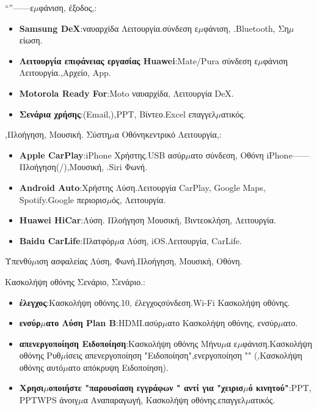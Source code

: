 “”——ε$\mu$φάνιση, έξοδος,:

\begin{itemize}
  \item \textbf{Samsung DeX}:ναυαρχίδα Λειτουργία.σύνδεση ε$\mu$φάνιση, .Bluetooth, Ση$\mu$είωση.
  \item \textbf{Λειτουργία επιφάνειας εργασίας Huawei}:Mate/Pura σύνδεση ε$\mu$φάνιση Λειτουργία.,Αρχείο, App.
  \item \textbf{Motorola Ready For}:Moto ναυαρχίδα, Λειτουργία DeX.
  \item \textbf{Σενάρια χρήσης}:(Email,),PPT, Βίντεο.Excel επαγγελ$\mu$ατικός.
\end{itemize}


,Πλοήγηση, Μουσική. Σύστη$\mu$α Οθόνηκεντρικό Λειτουργία,:

\begin{itemize}
  \item \textbf{Apple CarPlay}:iPhone Χρήστης.USB ασύρ$\mu$ατο σύνδεση, Οθόνη iPhone——Πλοήγηση(/),Μουσική, .Siri Φωνή.
  \item \textbf{Android Auto}:Χρήστης Λύση.Λειτουργία CarPlay, Google Maps, Spotify.Google περιορισ$\mu$ός, Λειτουργία.
  \item \textbf{Huawei HiCar}:Λύση. Πλοήγηση Μουσική, Βιντεοκλήση, Λειτουργία.
  \item \textbf{Baidu CarLife}:Πλατφόρ$\mu$α Λύση, iOS.Λειτουργία, CarLife.
\end{itemize}

\begin{tcbwarn}{Υπενθύ$\mu$ιση ασφαλείας}
Λύση, Φωνή.Πλοήγηση, Μουσική, Οθόνη.

\end{tcbwarn}


Κασκολήψη οθόνης Σενάριο, Σενάριο.:

\begin{itemize}
  \item \textbf{έλεγχος}:Κασκολήψη οθόνης.10, έλεγχοςσύνδεση.Wi-Fi Κασκολήψη οθόνης.
  \item \textbf{ενσύρ$\mu$ατο Λύση Plan B}:HDMI.ασύρ$\mu$ατο Κασκολήψη οθόνης, ενσύρ$\mu$ατο.
  \item \textbf{απενεργοποίηση Ειδοποίηση}:Κασκολήψη οθόνης Μήνυ$\mu$α ε$\mu$φάνιση.Κασκολήψη οθόνης Ρυθ$\mu$ίσεις απενεργοποίηση "Ειδοποίηση",ενεργοποίηση "" (,Κασκολήψη οθόνης αυτό$\mu$ατο απόκρυψη Ειδοποίηση).
  \item \textbf{Χρησι$\mu$οποιήστε "παρουσίαση εγγράφων " αντί για "χειρισ$\mu$ό κινητού"}:PPT, PPTWPS άνοιγ$\mu$α Αναπαραγωγή, Κασκολήψη οθόνης.επαγγελ$\mu$ατικός.
\end{itemize}

